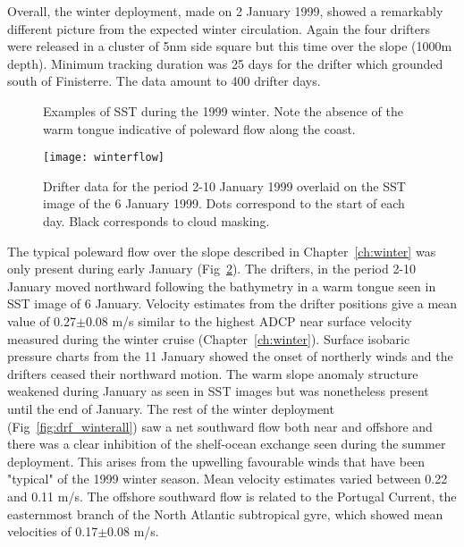 Overall, the winter deployment, made on 2 January 1999, showed a
remarkably different picture from the expected winter circulation.
Again the four drifters were released in a cluster of 5nm side
square but this time over the slope (1000m depth). Minimum
tracking duration was 25 days for the drifter which grounded south
of Finisterre. The data amount to 400 drifter days.

\begin{figure}
\centering \abajocap {}%
%
\caption{Examples of SST during the 1999 winter. Note the absence
of the warm tongue indicative of poleward flow along the coast. }
\label{fig:drf_sst99}
\end{figure}
\begin{figure}
\centering %
\texttt{[image: winterflow]}%
\caption{Drifter data for the period 2-10 January 1999 overlaid on
the SST image of the 6 January 1999. Dots correspond to the start
of each day. Black corresponds to cloud masking.}
\label{fig:drf_pwflow}%
\end{figure}

The typical poleward flow over the slope described in
Chapter~\ref{ch:winter} was only present during early January
(Fig~\ref{fig:drf_pwflow}). The drifters, in the period 2-10
January moved northward following the bathymetry in a warm tongue
seen in SST image of 6 January. Velocity estimates from the
drifter positions give a mean value of 0.27$\pm$0.08 m/s similar
to the highest ADCP near surface velocity measured during the
winter cruise (Chapter~\ref{ch:winter}). Surface isobaric pressure
charts from the 11 January showed the onset of northerly winds and
the drifters ceased their northward motion. The warm slope anomaly
structure weakened during January as seen in SST images but was
nonetheless present until the end of January. The rest of the
winter deployment (Fig~\ref{fig:drf_winterall}) saw a net
southward flow both near and offshore  and there was a clear
inhibition of the shelf-ocean exchange seen during the summer
deployment. This arises from the upwelling favourable winds that
have been "typical" of the 1999 winter season. Mean velocity
estimates varied between 0.22 and 0.11 m/s. The offshore southward
flow is related to the Portugal Current, the easternmost branch of
the North Atlantic subtropical gyre, which showed mean velocities
of 0.17$\pm$0.08 m/s.

